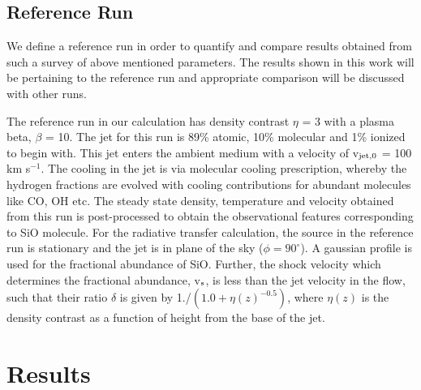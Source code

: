 \documentclass[useAMS,usenatbib,letters]{mn2e}
\begin{document}
\subsection{Reference Run}
\label{ssec:refrun}
We define a reference run in order to quantify and compare results obtained from such a
survey of above mentioned parameters. The results shown in this work will be
pertaining to the reference run and appropriate comparison will be
discussed with other runs.
%

The reference run in our calculation has density contrast $\eta$ = 3
with a plasma beta, $\beta$ = 10. The jet for this run is 89\% atomic,
10\% molecular and 1\% ionized to begin with. This jet enters the
ambient medium with a velocity of v$_{\rm jet,0}$ = 100 km
s$^{-1}$. The cooling in the jet is
via molecular cooling prescription, whereby the hydrogen fractions are
evolved with cooling contributions for abundant molecules like CO, OH
etc. The steady state density, temperature and velocity obtained from this 
run is post-processed to obtain the observational features
corresponding to SiO molecule. 
For the radiative transfer calculation, the source in the reference
run is stationary and the jet is in plane of the sky ($\phi =
90^{\circ}$). A gaussian profile is used for the fractional abundance
of SiO.
Further, the shock velocity which determines
the fractional abundance, v$_{\rm s}$, is less than the jet velocity in the
flow, such that their ratio $\delta$ is given by 1./$(1.0 +
\eta(z)^{-0.5})$, where $\eta(z)$ is the density contrast as a
function of height from the base of the jet.

\section{Results}
\end{document}
